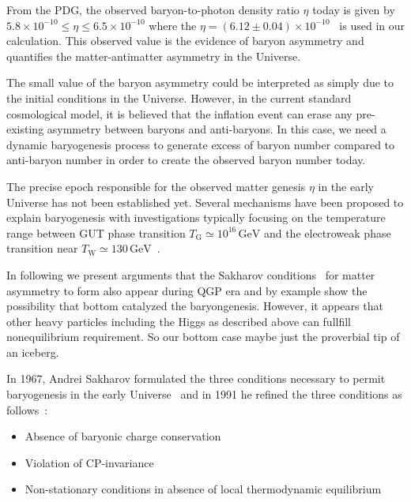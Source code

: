 From the PDG, the observed baryon-to-photon density ratio $\eta$ today is given by  $5.8\times10^{-10} \leqslant\eta\leqslant6.5\times10^{-10}$ \cite{ParticleDataGroup:2018ovx} where the $\eta=(6.12\pm0.04)\times10^{-10}$~\cite{ParticleDataGroup:2022pth} is used in our calculation. This observed value is the evidence of baryon asymmetry and quantifies the matter-antimatter asymmetry in the Universe.

The small value of the baryon asymmetry could be interpreted as simply due to the initial conditions in the Universe. However, in the current standard cosmological model, it is believed that the inflation event can erase any pre-existing asymmetry between baryons and anti-baryons. In this case, we need a dynamic baryogenesis process to generate excess of baryon number compared to anti-baryon number in order to create the observed baryon number today.

The precise epoch responsible for the observed matter genesis $\eta$  in the early Universe has not been established yet.  Several mechanisms have been proposed to explain baryogenesis with investigations typically focusing on the temperature range between GUT phase transition $T_\mathrm{G}\simeq10^{16}\,\mathrm{GeV}$ and the electroweak phase transition near $T_\mathrm{W}\simeq130\,\mathrm{GeV}$~\cite{Kuzmin:1985mm,Kuzmin:1987wn,Arnold:1987mh,Kolb:1996jt,Riotto:1999yt,Nielsen:2001fy,Giudice:2003jh,Davidson:2008bu,Morrissey:2012db}.

In following  we present arguments that the Sakharov conditions~\cite{Sakharov:1967dj} for matter asymmetry to form also appear during QGP era and by example show the possibility that bottom catalyzed the baryongenesis. However, it appears that other heavy particles including the Higgs as described above can fullfill nonequilibrium requirement. So our bottom case maybe just the proverbial tip of an iceberg.

In 1967, Andrei Sakharov  formulated the three conditions necessary to permit baryogenesis in the early Universe~\cite{Sakharov:1967dj} and in 1991 he refined the three conditions as follows~\cite{Sakharov:1988vdp}:
\begin{itemize}
  \item Absence of baryonic charge conservation 
  \item Violation of CP-invariance
  \item Non-stationary conditions in absence of local thermodynamic equilibrium
\end{itemize}
 
